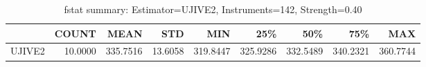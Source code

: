 \begin{table}[ht]
\centering
\caption{fstat summary: Estimator=UJIVE2, Instruments=142, Strength=0.40}
\begin{tabular}{lrrrrrrrr}
\toprule
 & COUNT & MEAN & STD & MIN & 25\% & 50\% & 75\% & MAX \\
\midrule
UJIVE2 & 10.0000 & 335.7516 & 13.6058 & 319.8447 & 325.9286 & 332.5489 & 340.2321 & 360.7744 \\
\bottomrule
\end{tabular}
\end{table}

